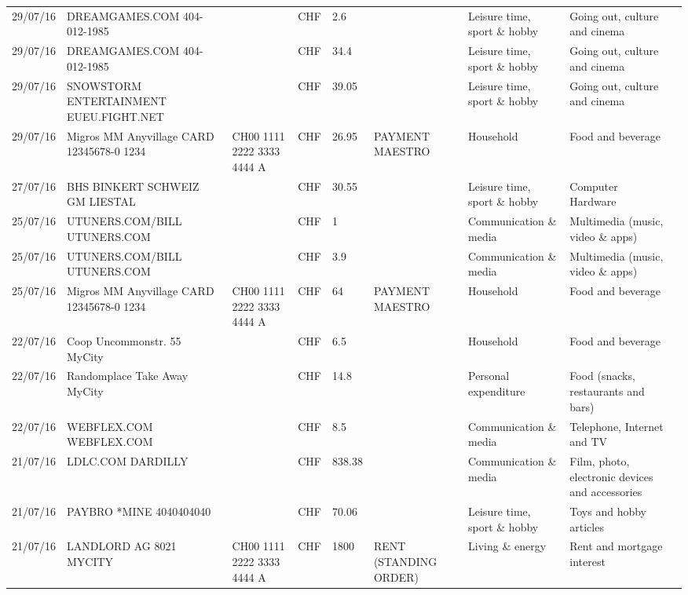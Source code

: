\begin{landscape}
\begin{tiny}
\begin{longtable}{lp{4cm}llllp{3cm}ll}
		    29/07/16 & DREAMGAMES.COM           404-012-1985 &       & CHF   & 2.6   &       & Leisure time, sport \& hobby & Going out, culture and cinema \\
		    29/07/16 & DREAMGAMES.COM           404-012-1985 &       & CHF   & 34.4  &       & Leisure time, sport \& hobby & Going out, culture and cinema \\
		    29/07/16 & SNOWSTORM ENTERTAINMENT EUEU.FIGHT.NET &       & CHF   & 39.05 &       & Leisure time, sport \& hobby & Going out, culture and cinema \\
		    29/07/16 & Migros MM Anyvillage CARD 12345678-0 1234 & CH00 1111 2222 3333 4444 A & CHF   & 26.95 & PAYMENT MAESTRO & Household & Food and beverage \\
		    27/07/16 & BHS BINKERT SCHWEIZ GM   LIESTAL &       & CHF   & 30.55 &       & Leisure time, sport \& hobby & Computer Hardware \\
		    25/07/16 & UTUNERS.COM/BILL          UTUNERS.COM &       & CHF   & 1     &       & Communication \& media & Multimedia (music, video \& apps) \\
		    25/07/16 & UTUNERS.COM/BILL          UTUNERS.COM &       & CHF   & 3.9   &       & Communication \& media & Multimedia (music, video \& apps) \\
		    25/07/16 & Migros MM Anyvillage CARD 12345678-0 1234 & CH00 1111 2222 3333 4444 A & CHF   & 64    & PAYMENT MAESTRO & Household & Food and beverage \\
		    22/07/16 & Coop Uncommonstr. 55   MyCity &       & CHF   & 6.5   &       & Household & Food and beverage \\
		    22/07/16 & Randomplace Take Away     MyCity &       & CHF   & 14.8  &       & Personal expenditure & Food (snacks, restaurants and bars) \\
		    22/07/16 & WEBFLEX.COM              WEBFLEX.COM &       & CHF   & 8.5   &       & Communication \& media & Telephone,  Internet and TV \\
		    21/07/16 & LDLC.COM                 DARDILLY &       & CHF   & 838.38 &       & Communication \& media & Film, photo, electronic devices and accessories \\
		    21/07/16 & PAYBRO *MINE       4040404040 &       & CHF   & 70.06 &       & Leisure time, sport \& hobby & Toys and hobby articles \\
		    21/07/16 & LANDLORD AG 8021 MYCITY & CH00 1111 2222 3333 4444 A & CHF   & 1800  & RENT (STANDING ORDER) & Living \& energy & Rent and mortgage interest \\

\end{longtable}
\end{tiny}
\end{landscape}
